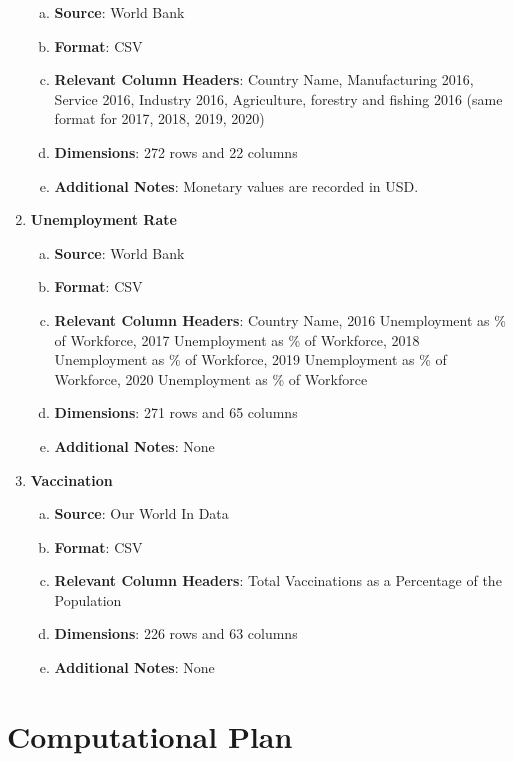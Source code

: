 \documentclass[fontsize=11pt]{article}
\begin{document}
\begin{enumerate}
\begin{enumerate}[(a)]
            \item \textbf{Source}: World Bank
            \item \textbf{Format}: CSV
            \item \textbf{Relevant Column Headers}: Country Name, Manufacturing 2016, Service 2016, Industry 2016, Agriculture, forestry and fishing 2016 (same format for 2017, 2018, 2019, 2020)
            \item \textbf{Dimensions}: 272 rows and 22 columns
            \item \textbf{Additional Notes}: Monetary values are recorded in USD.
        \end{enumerate}
    \item \textbf{Unemployment Rate}
        \begin{enumerate}[(a)]
            \item \textbf{Source}: World Bank
            \item \textbf{Format}: CSV
            \item \textbf{Relevant Column Headers}: Country Name, 2016 Unemployment as \% of Workforce, 2017 Unemployment as \% of Workforce, 2018 Unemployment as \% of Workforce, 2019 Unemployment as \% of Workforce, 2020 Unemployment as \% of Workforce
            \item \textbf{Dimensions}: 271 rows and 65 columns
            \item \textbf{Additional Notes}: None
        \end{enumerate}
    \item \textbf{Vaccination}
        \begin{enumerate}[(a)]
            \item \textbf{Source}: Our World In Data
            \item \textbf{Format}: CSV
            \item \textbf{Relevant Column Headers}: Total Vaccinations as a Percentage of the Population
            \item \textbf{Dimensions}: 226 rows and 63 columns
            \item \textbf{Additional Notes}: None
        \end{enumerate}
\end{enumerate}

\section*{Computational Plan}
\end{document}
